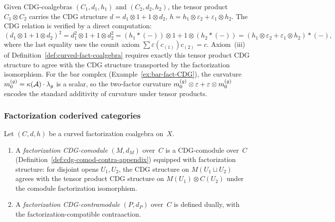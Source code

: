 \begin{remark}
\label{rem:curvature-factorization}
Given CDG-coalgebras $(C_1, d_1, h_1)$ and $(C_2, d_2, h_2)$,
the tensor product $C_1 \otimes C_2$ carries the CDG structure
$d = d_1 \otimes 1 + 1 \otimes d_2$,
$h = h_1 \otimes \varepsilon_2 + \varepsilon_1 \otimes h_2$.
The CDG relation is verified by a direct computation:
\[
(d_1 \otimes 1 + 1 \otimes d_2)^2
= d_1^2 \otimes 1 + 1 \otimes d_2^2
= (h_1 \ast ({-})) \otimes 1 + 1 \otimes (h_2 \ast ({-}))
= (h_1 \otimes \varepsilon_2 + \varepsilon_1 \otimes h_2)
\ast ({-}),
\]
where the last equality uses the counit axiom
$\sum \varepsilon(c_{(1)}) c_{(2)} = c$.
Axiom~(iii) of Definition~\ref{def:curved-fact-coalgebra}
requires exactly this tensor product CDG structure to agree with
the CDG structure transported by the factorization isomorphism.
For the bar complex (Example~\ref{ex:bar-fact-CDG}), the curvature
$m_0^{(g)} = \kappa(\mathcal{A}) \cdot \lambda_g$ is a scalar, so the
two-factor curvature
$m_0^{(g)} \otimes \varepsilon + \varepsilon \otimes m_0^{(g)}$
encodes the standard additivity of curvature under tensor products.
\end{remark}

\subsubsection*{Factorization coderived categories}

\begin{definition}
\label{def:fact-cdg-comod-contra}
Let $(C, d, h)$ be a curved factorization coalgebra on~$X$.
\begin{enumerate}[label=\textup{(\roman*)}]
\item A \emph{factorization CDG-comodule} $(M, d_M)$ over~$C$
  is a CDG-comodule over~$C$
  (Definition~\ref{def:cdg-comod-contra-appendix}) equipped with
  factorization structure: for disjoint opens $U_1, U_2$, the
  CDG structure on $M(U_1 \sqcup U_2)$ agrees with the tensor
  product CDG structure on
  $M(U_1) \otimes C(U_2)$
  under the comodule factorization isomorphism.
\item A \emph{factorization CDG-contramodule} $(P, d_P)$
  over~$C$ is defined dually, with the factorization-compatible
  contraaction.
\end{enumerate}
\end{definition}

